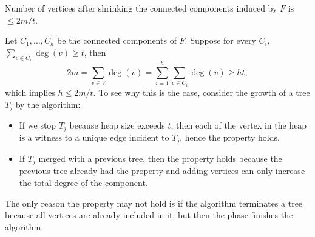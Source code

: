 \begin{claim}\label{clm:Fredman-Tarjan}
	Number of vertices after shrinking the connected components induced by \(F\) is \(\leq 2m / t\).
\end{claim}
\begin{explanation}
	Let \(C_1, \dots , C_h\) be the connected components of \(F\). Suppose for every \(C_i\), \(\sum_{v \in C_i} \deg(v) \geq t\), then
	\[
		2m
		= \sum_{v \in V} \deg(v)
		= \sum_{i=1}^{h} \sum_{v \in C_i} \deg(v)
		\geq ht,
	\]
	which implies \(h \leq 2m / t\). To see why this is the case, consider the growth of a tree \(T_j\) by the algorithm:
	\begin{itemize}
		\item If we stop \(T_j\) because heap size exceeds \(t\), then each of the vertex in the heap is a witness to a unique edge incident to \(T_j\), hence the property holds.
		\item If \(T_j\) merged with a previous tree, then the property holds because the previous tree already had the property and adding vertices can only increase the total degree of the component.
	\end{itemize}
	The only reason the property may not hold is if the algorithm terminates a tree because all vertices are already included in it, but then the phase finishes the algorithm.
\end{explanation}

